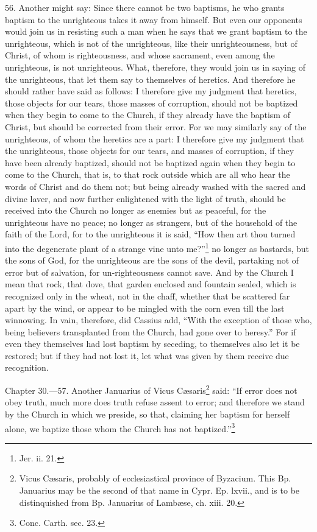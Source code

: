 56. Another might say: Since there cannot be two baptisms, he who grants baptism to the unrighteous takes it away from himself. But even our opponents would join us in resisting such a man when he says that we grant baptism to the unrighteous, which is not of the unrighteous, like their unrighteousness, but of Christ, of whom is righteousness, and whose sacrament, even among the unrighteous, is not unrighteous. What, therefore, they would join us in saying of the unrighteous, that let them say to themselves of heretics. And therefore he should rather have said as follows: I therefore give my judgment that heretics, those objects for our tears, those masses of corruption, should not be baptized when they begin to come to the Church, if they already have the baptism of Christ, but should be corrected from their error. For we may similarly say of the unrighteous, of whom the heretics are a part: I therefore give my judgment that the unrighteous, those objects for our tears, and masses of corruption, if they have been already baptized, should not be baptized again when they begin to come to the Church, that is, to that rock outside which are all who hear the words of Christ and do them not; but being already washed with the sacred and divine laver, and now further enlightened with the light of truth, should be received into the Church no longer as enemies but as peaceful, for the unrighteous have no peace; no longer as strangers, but of the household of the faith of the Lord, for to the unrighteous it is said, ``How then art thou turned into the degenerate plant of a strange vine unto me?''\footnote{\par  Jer. ii. 21.} no longer as bastards, but the sons of God, for the unrighteous are the sons of the devil, partaking not of error but of salvation, for un-righteousness cannot save. And by the Church I mean that rock, that dove, that garden enclosed and fountain sealed, which is recognized only in the wheat, not in the chaff, whether that be scattered far apart by the wind, or appear to be mingled with the corn even till the last winnowing. In vain, therefore, did Cassius add, ``With the exception of those who, being believers transplanted from the Church, had gone over to heresy.'' For if even they themselves had lost baptism by seceding, to themselves also let it be restored; but if they had not lost it, let what was given by them receive due recognition.


Chapter 30.—57. Another Januarius of Vicus Cæsaris\footnote{\par  Vicus Cæsaris, probably of ecclesiastical province of Byzacium. This Bp. Januarius may be the second of that name in Cypr. Ep. lxvii., and is to be distinquished from Bp. Januarius of Lambæse, ch. xiii. 20.} said: ``If error does not obey truth, much more does truth refuse assent to error; and therefore we stand by the Church in which we preside, so that, claiming her baptism for herself alone, we baptize those whom the Church has not baptized.''\footnote{\par  Conc. Carth. sec. 23.}

